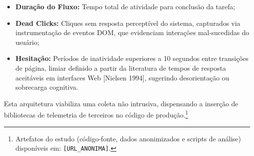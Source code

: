 \documentclass[12pt]{article}
\begin{document}
\begin{itemize}
    \item \textbf{Duração do Fluxo:} Tempo total de atividade para conclusão da tarefa;
    \item \textbf{Dead Clicks:} Cliques sem resposta perceptível do sistema, capturados via instrumentação de eventos DOM, que evidenciam interações mal-sucedidas do usuário;
    \item \textbf{Hesitação:} Períodos de inatividade superiores a 10 segundos entre transições de página, limiar definido a partir da literatura de tempos de resposta aceitáveis em interfaces Web [Nielsen 1994], sugerindo desorientação ou sobrecarga cognitiva.
\end{itemize}

Esta arquitetura viabiliza uma coleta não intrusiva, dispensando a inserção de bibliotecas de telemetria de terceiros no código de produção.\footnote{Artefatos do estudo (código-fonte, dados anonimizados e scripts de análise) disponíveis em: \texttt{[URL\_ANONIMA]}.}
\end{document}
